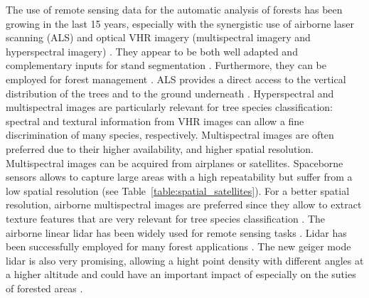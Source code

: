 The use of remote sensing data for the automatic analysis of forests has been growing in the last 15 years, especially with the synergistic use of airborne laser scanning (ALS) and optical VHR imagery (multispectral imagery and hyperspectral imagery) \citep{torabzadeh2014fusion,White2016CJRS}. They appear to be both well adapted and complementary inputs for stand segmentation \citep{dalponte2012tree,dalponte2015delineation,7500049}. Furthermore, they can be employed for forest management \citep{tokola2015remote, wulder2008role, patenaude2005synthesis}. ALS provides a direct access to the vertical distribution of the trees and to the ground underneath \citep{holmgren2004prediction}. Hyperspectral and multispectral images are particularly relevant for tree species classification: spectral and textural information from VHR  images can allow a fine discrimination of many species, respectively. Multispectral images are often preferred due to their higher availability, and higher spatial resolution. Multispectral images can be acquired from airplanes or satellites. Spaceborne sensors allows to capture large areas with a high repeatability but suffer from a low spatial resolution (see Table~\ref{table:spatial_satellites}). For a better spatial resolution, airborne multispectral images are preferred since they allow to extract texture features that are very relevant for tree species classification \citep{franklin2000incorporating}. The airborne linear lidar has been widely used for remote sensing tasks \citep{lim2003lidar, shan2008topographic, vosselman2010airborne}. Lidar has been successfully employed for many forest applications \citep{ferraz2016lidar}. The new geiger mode lidar is also very promising, allowing a hight point density with different angles at a higher altitude \citep{ullrich2016linear} and could have an important impact of especially on the suties of forested areas \citep{jakubowski2013tradeoffs, strunk2012effects}. \\



